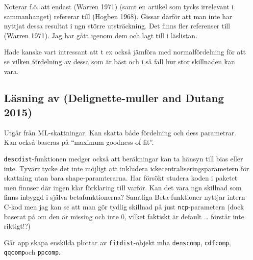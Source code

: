\documentclass[]{article}
\begin{document}
Noterar f.ö. att endast (Warren 1971) (samt en artikel som tycks
irrelevant i sammanhanget) refererar till (Hogben 1968). Gissar därför
att man inte har nyttjat dessa resultat i ngn större utsträckning. Det
finns fler referenser till (Warren 1971). Jag har gått igenom dem och
lagt till i läslistan.

Hade kanske vart intressant att t ex också jämföra med normalfördelning
för att se vilken fördelning av dessa som är bäst och i så fall hur stor
skillnaden kan vara.

\subsection{Läsning av (Delignette-muller and Dutang
2015)}\label{lasning-av-fitdistrplus}

Utgår från ML-skattningar. Kan skatta både fördelning och dess
parametrar. Kan också baseras på ``maximum goodness-of-fit''.

\texttt{descdist}-funktionen medger också att beräkningar kan ta hänsyn
till bias eller inte. Tyvärr tycke det inte möjligt att inkludera
ickecentraliseringsparametern för skattning utan bara
shape-paramterarna. Har försökt studera koden i paketet men finnser där
ingen klar förklaring till varför. Kan det vara ngn skillnad som finns
inbyggd i själva betafunktionerna? Samtliga Beta-funktioner nyttjar
intern C-kod men jag kan se att man gör tydlig skillnad på just
\texttt{ncp}-parametern (dock baserat på om den är missing och inte 0,
vilket faktiskt är default \ldots{} förstår inte riktigt!?)

Går app skapa enskilda plottar av \texttt{fitdist}-objekt mha
\texttt{denscomp}, \texttt{cdfcomp}, \texttt{qqcomp}och \texttt{ppcomp}.
\end{document}

